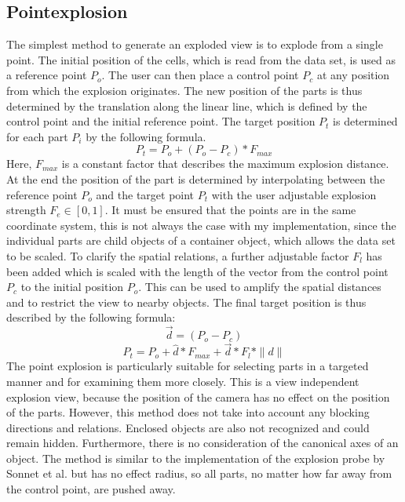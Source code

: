 \subsection{Pointexplosion}
The simplest method to generate an exploded view is to explode from a single point.
The initial position of the cells, which is read from the data set, is used as a reference point $P_o$. 
The user can then place a control point $P_c$ at any position from which the explosion originates. 
The new position of the parts is thus determined by the translation along the linear line, which is defined by the control point and the initial reference point.
The target position $P_t$ is determined for each part $P_i$ by the following formula. 
\begin{equation}
	P_t = P_o + (P_o - P_c) * F_{max}
	\label{eq:pointExpl1}
\end{equation}
Here, $F_{max}$ is a constant factor that describes the maximum explosion distance. At the end the position of the part is determined by interpolating between the reference point $P_o$ and the target point $P_t$ with the user adjustable explosion strength $F_e \in [0, 1]$.
It must be ensured that the points are in the same coordinate system, this is not always the case with my implementation, since the individual parts are child objects of a container object, which allows the data set to be scaled.
To clarify the spatial relations, a further adjustable factor $F_l$ has been added which is scaled with the length of the vector from the control point $P_c$ to the initial position $P_o$. This can be used to amplify the spatial distances and to restrict the view to nearby objects.
The final target position is thus described by the following formula:
\begin{equation}
	\vec{d} = (P_o - P_c) 
	\label{eq:pointExpl2}
\end{equation}
\begin{equation} 
	P_t = P_o + \hat{d} * F_{max} + \vec{d} * F_l * \|d\|
	\label{eq:pointExpl3}
\end{equation}
The point explosion is particularly suitable for selecting parts in a targeted manner and for examining them more closely.
This is a view independent explosion view, because the position of the camera has no effect on the position of the parts. 
However, this method does not take into account any blocking directions and relations. 
Enclosed objects are also not recognized and could remain hidden.
Furthermore, there is no consideration of the canonical axes of an object.
The method is similar to the implementation of the explosion probe by Sonnet et al.\cite{Sonnet_2004} but has no effect radius, so all parts, no matter how far away from the control point, are pushed away.

